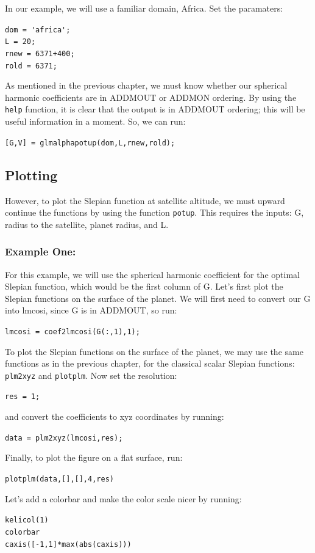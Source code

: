 \documentclass[11pt]{article}
\begin{document}
In our example, we will use a familiar domain, Africa.  Set the paramaters:
 
\verb+dom = 'africa';+  \\
\verb+L = 20;+ \\
\verb|rnew = 6371+400;|  \\
\verb+rold = 6371;+  

As mentioned in the previous chapter, we must know whether our spherical harmonic coefficients are in ADDMOUT or ADDMON ordering.  By using the \verb+help+ function, it is clear that the output is in ADDMOUT ordering; this will be useful information in a moment.  So, we can run:

\verb+[G,V] = glmalphapotup(dom,L,rnew,rold);+

\subsection{Plotting}
However, to plot the Slepian function at satellite altitude, we must upward continue the functions by using the function \verb+potup+.  This requires the inputs: G, radius to the satellite, planet radius, and L.  

\subsubsection{Example One:}
For this example, we will use the spherical harmonic coefficient for the optimal Slepian function, which would be the first column of G.  Let's first plot the Slepian functions on the surface of the planet.  We will first need to convert our G into lmcosi, since G is in ADDMOUT, so run:

\verb+lmcosi = coef2lmcosi(G(:,1),1);+

To plot the Slepian functions on the surface of the planet, we may use the same functions as in the previous chapter, for the classical scalar Slepian functions: \verb+plm2xyz+ and \verb+plotplm+.  Now set the resolution:

\verb+res = 1;+ 

and convert the coefficients to xyz coordinates by running:

\verb+data = plm2xyz(lmcosi,res);+

Finally, to plot the figure on a flat surface, run:

\verb+plotplm(data,[],[],4,res)+

Let's add a colorbar and make the color scale nicer by running:

\verb+kelicol(1)+\\
\verb+colorbar+\\
\verb+caxis([-1,1]*max(abs(caxis)))+
\end{document}
